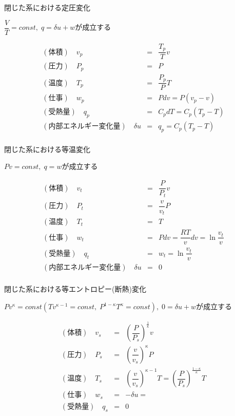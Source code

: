 \documentclass[a4paper]{jsarticle}
\begin{document}
\begin{itembox}[l]{閉じた系における定圧変化}
    \begin{center}
        $\dfrac{V}{T}=const,\; q=\delta u+w$が成立する
    \end{center}
    \begin{eqnarray*}
        (体積)\quad v_p&=&\dfrac{T_p}{T}v\\
        (圧力)\quad P_p&=&P\\
        (温度)\quad T_p&=&\dfrac{P_p}{P}T\\
        (仕事)\quad w_p&=&Pdv=P\left(v_p-v\right)\\
        (受熱量)\quad q_p&=&C_pdT=C_p\left(T_p-T\right)\\
        (内部エネルギー変化量)\quad \delta u&=&q_p=C_p\left(T_p-T\right)\\
    \end{eqnarray*}
\end{itembox}
\begin{itembox}[l]{閉じた系における等温変化}
    \begin{center}
        $Pv=const,\; q=w$が成立する
    \end{center}
    \begin{eqnarray*}
        (体積)\quad v_t&=&\dfrac{P}{P_t}v\\
        (圧力)\quad P_t&=&\dfrac{v}{v_t}P\\
        (温度)\quad T_t&=&T\\
        (仕事)\quad w_t&=&Pdv=\dfrac{RT}{v}dv=\ln{\dfrac{v_t}{v}}\\
        (受熱量)\quad q_t&=&w_t=\ln{\dfrac{v_t}{v}}\\
        (内部エネルギー変化量)\quad \delta u&=&0\\
    \end{eqnarray*}
\end{itembox}
\begin{itembox}[l]{閉じた系における等エントロピー(断熱)変化}
    \begin{center}
        $Pv^\kappa=const\left(Tv^{\kappa -1}=const,\; P^{1-\kappa}T^\kappa=const\right),\; 0=\delta u+w$が成立する
    \end{center}
    \begin{eqnarray*}
        (体積)\quad v_s&=&\left(\dfrac{P}{P_s}\right)^{\frac{1}{\kappa}}v\\
        (圧力)\quad P_s&=&\left(\dfrac{v}{v_s}\right)^\kappa P\\
        (温度)\quad T_s&=&\left(\dfrac{v}{v_s}\right)^{\kappa -1}T=\left(\dfrac{P}{P_s}\right)^{\frac{1-\kappa}{\kappa}}T\\
        (仕事)\quad w_s&=&-\delta u=\\
        (受熱量)\quad q_s&=&0\\
    \end{eqnarray*}
\end{itembox}
\end{document}
